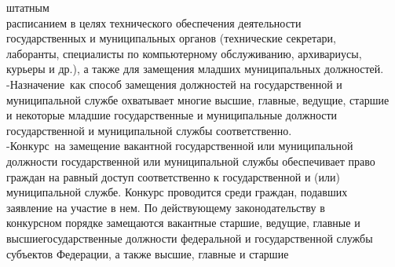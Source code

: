 \documentclass[14pt,a4paper]{extarticle}
\begin{document}
штатным \\   \vspace{1em} расписанием в целях технического обеспечения деятельности \\   \vspace{1em} государственных и муниципальных органов (технические секретари, \\   \vspace{1em} лаборанты, специалисты по компьютерному обслуживанию,
архивариусы, \\   \vspace{1em} курьеры и др.), а также для замещения младших муниципальных
должностей. \\   \vspace{1em} -Назначение как способ замещения должностей на государственной и \\   \vspace{1em} муниципальной службе охватывает многие высшие, главные, ведущие,
старшие \\   \vspace{1em} и некоторые младшие государственные и муниципальные должности \\   \vspace{1em} государственной и муниципальной службы соответственно. \\   \vspace{1em} -Конкурс на замещение вакантной государственной или муниципальной \\   \vspace{1em} должности государственной или муниципальной службы обеспечивает
право \\   \vspace{1em} граждан на равный доступ соответственно к государственной и (или) \\   \vspace{1em} муниципальной службе. Конкурс проводится среди граждан, подавших \\   \vspace{1em} заявление на участие в нем. По действующему законодательству в \\   \vspace{1em} конкурсном порядке замещаются вакантные старшие, ведущие, главные
и \\   \vspace{1em} высшиегосударственные должности федеральной и государственной
службы \\   \vspace{1em} субъектов Федерации, а также высшие, главные и старшие
\end{document}
